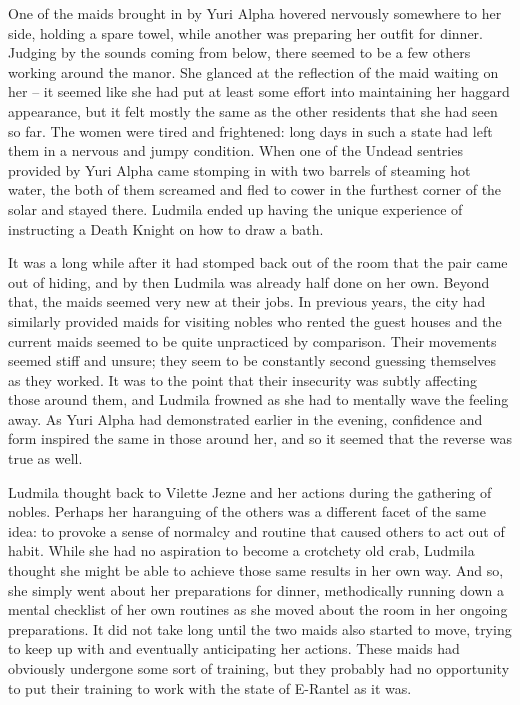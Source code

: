  

One of the maids brought in by Yuri Alpha hovered nervously somewhere to her side, holding a spare towel, while another was preparing her outfit for dinner. Judging by the sounds coming from below, there seemed to be a few others working around the manor. She glanced at the reflection of the maid waiting on her – it seemed like she had put at least some effort into maintaining her haggard appearance, but it felt mostly the same as the other residents that she had seen so far. The women were tired and frightened: long days in such a state had left them in a nervous and jumpy condition. When one of the Undead sentries provided by Yuri Alpha came stomping in with two barrels of steaming hot water, the both of them screamed and fled to cower in the furthest corner of the solar and stayed there. Ludmila ended up having the unique experience of instructing a Death Knight on how to draw a bath.

 

It was a long while after it had stomped back out of the room that the pair came out of hiding, and by then Ludmila was already half done on her own. Beyond that, the maids seemed very new at their jobs. In previous years, the city had similarly provided maids for visiting nobles who rented the guest houses and the current maids seemed to be quite unpracticed by comparison. Their movements seemed stiff and unsure; they seem to be constantly second guessing themselves as they worked. It was to the point that their insecurity was subtly affecting those around them, and Ludmila frowned as she had to mentally wave the feeling away. As Yuri Alpha had demonstrated earlier in the evening, confidence and form inspired the same in those around her, and so it seemed that the reverse was true as well.

 

Ludmila thought back to Vilette Jezne and her actions during the gathering of nobles. Perhaps her haranguing of the others was a different facet of the same idea: to provoke a sense of normalcy and routine that caused others to act out of habit. While she had no aspiration to become a crotchety old crab, Ludmila thought she might be able to achieve those same results in her own way. And so, she simply went about her preparations for dinner, methodically running down a mental checklist of her own routines as she moved about the room in her ongoing preparations. It did not take long until the two maids also started to move, trying to keep up with and eventually anticipating her actions. These maids had obviously undergone some sort of training, but they probably had no opportunity to put their training to work with the state of E-Rantel as it was.

